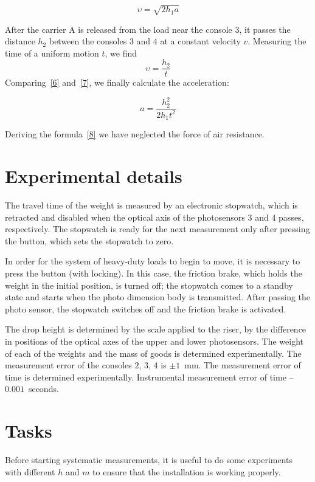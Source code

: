\documentclass{LabWorkEng}
\begin{document}
\begin{equation}\label{6}
	\upsilon  = \sqrt {2{h_1}a}
\end{equation}


After the carrier A is released from the load near the console $3$, it passes the distance $h_2$ between the consoles $3$ and $4$ at a constant velocity $v$. Measuring the time of a uniform motion $t$, we find
\begin{equation}\label{7}
	\upsilon  = \frac{{{h_2}}}{t}
\end{equation}
Comparing~\eqref{6} and~\eqref{7}, we finally calculate the acceleration:

\begin{equation}\label{8}
	a = \frac{{h_2^2}}{{2{h_1}{t^2}}}
\end{equation}


Deriving the formula~\eqref{8} we have neglected the force of air resistance.

\section{Experimental details}

The travel time of the weight is measured by an electronic stopwatch, which is retracted and disabled when the optical axis of the photosensors $3$ and $4$ passes, respectively. The stopwatch is ready for the next measurement only after pressing the   button, which sets the stopwatch to zero.

In order for the system of heavy-duty loads to begin to move, it is necessary to press the  button (with locking). In this case, the friction brake, which holds the weight in the initial position, is turned off;
the stopwatch comes to a standby state and starts when the photo dimension body is transmitted. After passing the photo sensor, the stopwatch switches off and the friction brake is activated.

The drop height is determined by the scale applied to the riser, by the difference in positions of the optical axes of the upper and lower photosensors. The weight of each of the weights and the mass of goods is determined experimentally. The measurement error of the consoles $2$, $3$, 4 is $\pm 1$~mm. The measurement error of time is determined experimentally. Instrumental measurement error of time -- $0.001$~seconds.

\section{Tasks}
Before starting systematic measurements, it is useful to do some experiments with different $h$ and $m$ to ensure that the installation is working properly.
\end{document}
